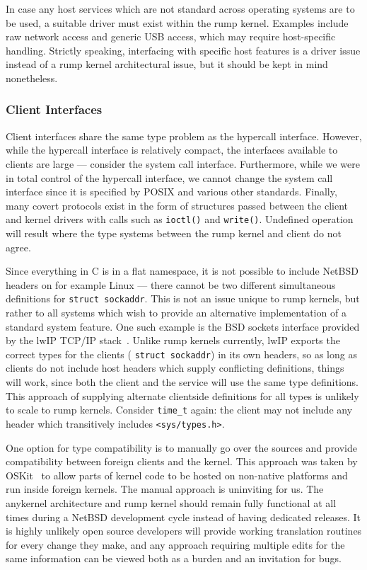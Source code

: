In case any host services which are not standard across operating
systems are to be used, a suitable driver must exist within the
rump kernel.  Examples include raw network access and
generic USB access, which may require host-specific handling.
Strictly speaking, interfacing with specific host features is a
driver issue instead of a rump kernel architectural issue, but it should
be kept in mind nonetheless.

\subsubsection*{Client Interfaces}

Client interfaces share the same type problem as the hypercall interface.
However, while the hypercall interface is relatively compact, the
interfaces available to clients are large --- consider the system
call interface.  Furthermore, while we were in total control of the
hypercall interface, we cannot change the system call interface since it
is specified by POSIX and various other standards.  Finally, many covert
protocols exist in the form of structures passed between the client and
kernel drivers with calls such as \texttt{ioctl()} and \texttt{write()}.
Undefined operation will result where the type systems between the rump
kernel and client do not agree.

Since everything in C is in a flat namespace, it is not possible to
include NetBSD headers on for example Linux --- there cannot be two
different simultaneous definitions for \verb+struct sockaddr+.  This is
not an issue unique to rump kernels, but rather to all systems which wish
to provide an alternative implementation of a standard system feature.
One such example is the BSD sockets interface provided by the lwIP
TCP/IP stack~\cite{dunkels:lwipdesign}.  Unlike rump kernels currently,
lwIP exports the correct types for the clients (\eg
\verb+struct sockaddr+) in its own headers, so as long as clients do
not include host headers which supply conflicting definitions, things
will work, since both the client and the service will use the same type
definitions.  This approach of supplying alternate clientside definitions
for all types is unlikely to scale to rump kernels.  Consider
\verb+time_t+ again: the client may not include any
header which transitively includes \verb+<sys/types.h>+.

One option for type compatibility is to manually go over the sources
and provide compatibility between foreign clients and the kernel.  This
approach was taken by OSKit~\cite{ford:oskit} to allow parts of kernel
code to be hosted on non-native platforms and run inside foreign kernels.
The manual approach is uninviting for us.  The anykernel architecture
and rump kernel should remain fully functional at all times during a
NetBSD development cycle instead of having dedicated releases.  It is
highly unlikely open source developers will provide working translation
routines for every change they make, and any approach requiring multiple
edits for the same information can be viewed both as a burden and an
invitation for bugs.

